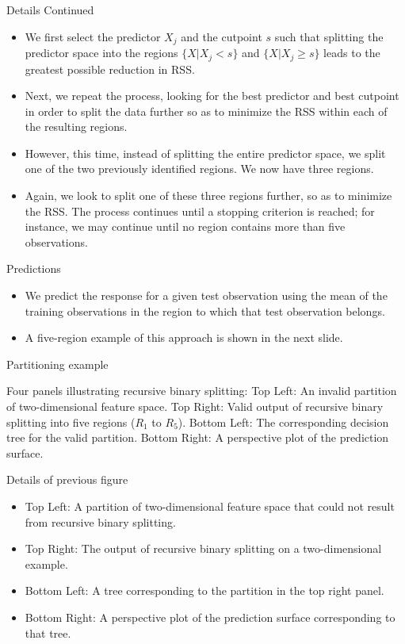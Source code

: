 \documentclass[aspectratio=169, 11pt]{beamer}
\begin{document}
\begin{frame}{Details Continued}
\begin{itemize}
    \item We first select the predictor $X_{j}$ and the cutpoint $s$ such that splitting the predictor space into the regions $\{X|X_{j}<s\}$ and $\{X|X_{j}\ge s\}$ leads to the greatest possible reduction in RSS.
    \item Next, we repeat the process, looking for the best predictor and best cutpoint in order to split the data further so as to minimize the RSS within each of the resulting regions.
    \item However, this time, instead of splitting the entire predictor space, we split one of the two previously identified regions. We now have three regions.
    \item Again, we look to split one of these three regions further, so as to minimize the RSS. The process continues until a stopping criterion is reached; for instance, we may continue until no region contains more than five observations.
\end{itemize}
\end{frame}

\begin{frame}{Predictions}
\begin{itemize}
    \item We predict the response for a given test observation using the mean of the training observations in the region to which that test observation belongs.
    \item A five-region example of this approach is shown in the next slide.
\end{itemize}
\end{frame}

\begin{frame}{Partitioning example}
\begin{tcolorbox}[colback=LightGray,title=Figure]
Four panels illustrating recursive binary splitting: 
Top Left: An invalid partition of two-dimensional feature space. 
Top Right: Valid output of recursive binary splitting into five regions ($R_1$ to $R_5$). 
Bottom Left: The corresponding decision tree for the valid partition. 
Bottom Right: A perspective plot of the prediction surface.
\end{tcolorbox}
\end{frame}

\begin{frame}{Details of previous figure}
\begin{itemize}
    \item Top Left: A partition of two-dimensional feature space that could not result from recursive binary splitting.
    \item Top Right: The output of recursive binary splitting on a two-dimensional example.
    \item Bottom Left: A tree corresponding to the partition in the top right panel.
    \item Bottom Right: A perspective plot of the prediction surface corresponding to that tree.
\end{itemize}
\end{frame}
\end{document}
